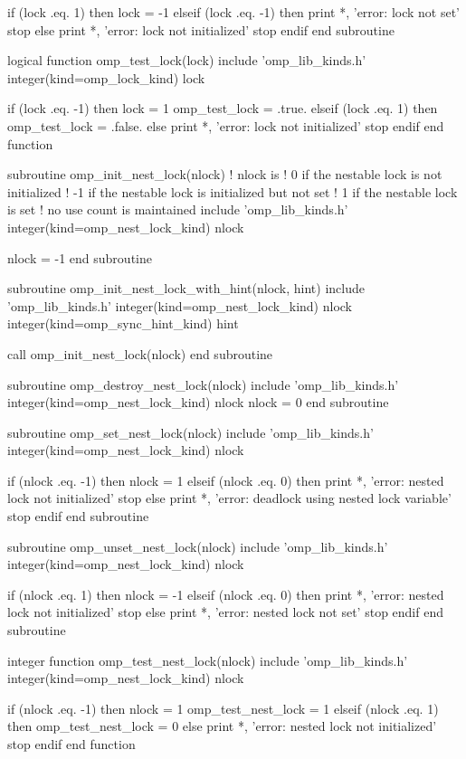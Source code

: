 {\begin{ompfFunction}
  if (lock .eq. 1) then
    lock = -1
  elseif (lock .eq. -1) then
    print *, 'error: lock not set'
    stop
  else
    print *, 'error: lock not initialized'
    stop
  endif
end subroutine

logical function omp_test_lock(lock)
  include 'omp_lib_kinds.h'
  integer(kind=omp_lock_kind) lock

  if (lock .eq. -1) then
    lock = 1
    omp_test_lock = .true.
  elseif (lock .eq. 1) then
    omp_test_lock = .false.
  else
    print *, 'error: lock not initialized'
    stop
  endif
end function

subroutine omp_init_nest_lock(nlock)
  ! nlock is
  ! 0 if the nestable lock is not initialized
  ! -1 if the nestable lock is initialized but not set
  ! 1 if the nestable lock is set
  ! no use count is maintained
  include 'omp_lib_kinds.h'
  integer(kind=omp_nest_lock_kind) nlock

  nlock = -1
end subroutine

subroutine omp_init_nest_lock_with_hint(nlock, hint)
  include 'omp_lib_kinds.h'
  integer(kind=omp_nest_lock_kind) nlock
  integer(kind=omp_sync_hint_kind) hint

  call omp_init_nest_lock(nlock)
end subroutine

subroutine omp_destroy_nest_lock(nlock)
  include 'omp_lib_kinds.h'
  integer(kind=omp_nest_lock_kind) nlock
  nlock = 0
end subroutine

subroutine omp_set_nest_lock(nlock)
  include 'omp_lib_kinds.h'
  integer(kind=omp_nest_lock_kind) nlock

  if (nlock .eq. -1) then
    nlock = 1
  elseif (nlock .eq. 0) then
    print *, 'error: nested lock not initialized'
    stop
  else
    print *, 'error: deadlock using nested lock variable'
    stop
  endif
end subroutine

subroutine omp_unset_nest_lock(nlock)
  include 'omp_lib_kinds.h'
  integer(kind=omp_nest_lock_kind) nlock

  if (nlock .eq. 1) then
    nlock = -1
  elseif (nlock .eq. 0) then
    print *, 'error: nested lock not initialized'
    stop
  else
    print *, 'error: nested lock not set'
    stop
  endif
end subroutine

integer function omp_test_nest_lock(nlock)
  include 'omp_lib_kinds.h'
  integer(kind=omp_nest_lock_kind) nlock

  if (nlock .eq. -1) then
    nlock = 1
    omp_test_nest_lock = 1
  elseif (nlock .eq. 1) then
    omp_test_nest_lock = 0
  else
    print *, 'error: nested lock not initialized'
    stop
  endif
end function


\end{ompfFunction}}
